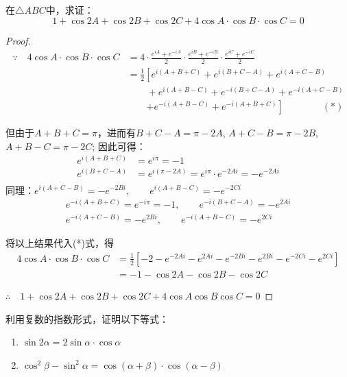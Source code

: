 \begin{example}
在$\triangle ABC$中，求证：
\[1+\cos 2A+\cos 2B+\cos 2C+4\cos A\cdot \cos B\cdot \cos C=0\]
\end{example}

\begin{proof}
\[\begin{split}
 \because\quad    4\cos A\cdot \cos B\cdot \cos C &=4\cdot\frac{e^{iA}+e^{-iA}}{2}\cdot\frac{e^{iB}+e^{-iB}}{2}\cdot\frac{e^{iC}+e^{-iC}}{2}\\
 &=\frac{1}{2}\left[e^{i(A+B+C)}+e^{i(B+C-A)}+e^{i(A+C-B)}\right.\\
 &\qquad   +e^{i(A+B-C)}+e^{-i(B+C-A)}+e^{-i(A+C-B)}\\
&\qquad  \left.+e^{-i(A+B-C)}+e^{-i(A+B+C)}\right]\qquad  \qquad  (*)
\end{split}\]

但由于$A+B+C=\pi$，进而有$B+C-A=\pi-2A$, 
$A+C-B=\pi-2B$, $A+B-C=\pi-2C$; 因此可得：
\[\begin{split}
    e^{i(A+B+C)}&=e^{i\pi}=-1\\
    e^{i(B+C-A)}&=e^{i(\pi-2A)}=e^{i\pi}\cdot e^{-2Ai}=-e^{-2Ai}\\
\end{split}\]
同理：$e^{i(A+C-B)}=-e^{-2Bi},\qquad e^{i(A+B-C)}=-e^{-2Ci}$
\[\begin{split}
    e^{-i(A+B+C)}=e^{-i\pi}=-1,\qquad 
    e^{-i(B+C-A)}=-e^{2Ai}\\
    e^{-i(A+C-B)}=-e^{2Bi},\qquad 
    e^{-i(A+B-C)}=-e^{2Ci}
\end{split}\]

将以上结果代入(*)式，得
\[\begin{split}
    4\cos A\cdot \cos B\cdot \cos C &=\frac{1}{2}\left[-2-e^{-2Ai}-e^{2Ai}-e^{-2Bi}-e^{2Bi}-e^{-2Ci}-e^{2Ci}\right]\\
    &=-1-\cos2A-\cos2B-\cos2C
\end{split}\]

$\therefore\quad 1+\cos 2A+\cos 2B+\cos 2C+4\cos A  \cos B  \cos C=0$
\end{proof}

\begin{ex}
利用复数的指数形式，证明以下等式：
\begin{enumerate}
    \item $\sin2\alpha=2\sin\alpha\cdot \cos\alpha$
    \item $\cos^2\beta-\sin^2\alpha=\cos(\alpha+\beta)\cdot \cos(\alpha-\beta)$
\end{enumerate}
\end{ex}

